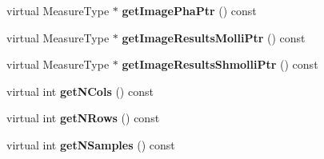 \begin{DoxyCompactItemize}
\item 
virtual Measure\+Type $\ast$ {\bfseries get\+Image\+Pha\+Ptr} () const \hypertarget{class_ox_1_1_test_image_a6e7c4c1195dfd0c1938c913b230b48a7}{}\label{class_ox_1_1_test_image_a6e7c4c1195dfd0c1938c913b230b48a7}

\item 
virtual Measure\+Type $\ast$ {\bfseries get\+Image\+Results\+Molli\+Ptr} () const \hypertarget{class_ox_1_1_test_image_a9da80782972a99cae274cde3de03bbda}{}\label{class_ox_1_1_test_image_a9da80782972a99cae274cde3de03bbda}

\item 
virtual Measure\+Type $\ast$ {\bfseries get\+Image\+Results\+Shmolli\+Ptr} () const \hypertarget{class_ox_1_1_test_image_aef09efd3eb4b1a37d3b6b479d1e4a016}{}\label{class_ox_1_1_test_image_aef09efd3eb4b1a37d3b6b479d1e4a016}

\item 
virtual int {\bfseries get\+N\+Cols} () const \hypertarget{class_ox_1_1_test_image_af5a9aadf12db9fdff87ed6aff4e0a2ef}{}\label{class_ox_1_1_test_image_af5a9aadf12db9fdff87ed6aff4e0a2ef}

\item 
virtual int {\bfseries get\+N\+Rows} () const \hypertarget{class_ox_1_1_test_image_acdc29d077640af69c4caac7c60d31cd6}{}\label{class_ox_1_1_test_image_acdc29d077640af69c4caac7c60d31cd6}

\item 
virtual int {\bfseries get\+N\+Samples} () const \hypertarget{class_ox_1_1_test_image_a87559c865b1f365c0bd7cfc9c5939d2b}{}\label{class_ox_1_1_test_image_a87559c865b1f365c0bd7cfc9c5939d2b}

\end{DoxyCompactItemize}

